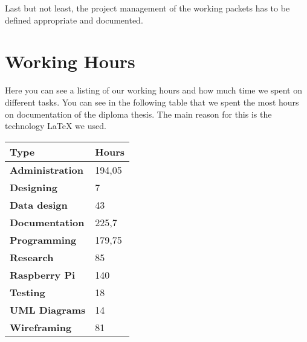Last but not least, the project management of the working packets has to be defined appropriate and documented.
\section*{Working Hours}
Here you can see a listing of our working hours and how much time we spent on different tasks. You can see in the following table that we spent the most hours on documentation of the diploma thesis. The main reason for this is the technology LaTeX we used. \newline
\begin{center}
\begin{tabular}{p{5cm}p{2cm}}
\toprule
\textbf{Type} & \textbf{Hours} \\
\midrule
\textbf{Administration} & 194,05 \\
\textbf{Designing} & 7 \\
\textbf{Data design} & 43 \\
\textbf{Documentation} & 225,7 \\
\textbf{Programming} & 179,75 \\
\textbf{Research} & 85 \\
\textbf{Raspberry Pi} & 140 \\
\textbf{Testing} & 18 \\
\textbf{UML Diagrams} & 14 \\
\textbf{Wireframing} & 81 \\
\bottomrule
\end{tabular}
\end{center}
